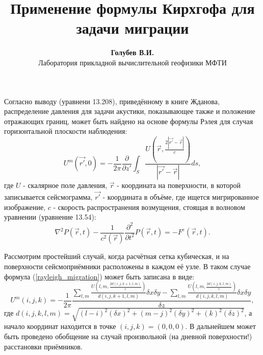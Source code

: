 \documentclass{article}
\begin{document}
\title{Применение формулы Кирхгофа для задачи миграции}
\author{\textbf{Голубев В.И.} \\ Лаборатория прикладной вычислительной геофизики МФТИ}
\maketitle
Согласно выводу (уравнени 13.208), приведённому в книге Жданова, распределение давления для
задачи акустики, показывающее также и положение отражающих границ,
может быть найдено на основе формулы Рэлея для случая горизонтальной плоскости
наблюдения:
\begin{equation}
\label{rayleigh_migration}
U^m(\vec{r'},0) = -\frac{1}{2\pi}\frac{\partial}{\partial z'}
	\int_S \frac{U(\vec{r},\frac{2|\vec{r'}-\vec{r}|}{c})}{|\vec{r'}-\vec{r}|}ds,
\end{equation}
где $U$ - скалярное поле давления, $\vec{r}$ - координата на поверхности, в которой записывается
сейсмограмма, $\vec{r'}$ - координата в объёме, где ищется мигрированное изображение, $c$ - скорость распространения возмущения, стоящая в волновом уравнении (уравнение 13.54):
\begin{equation}
\label{wave_equation}
\nabla^2P(\vec{r},t) - \frac{1}{c^2(\vec{r})}\frac{\partial^2}{\partial t^2}
	P(\vec{r},t) = - F^e(\vec{r},t).
\end{equation}

Рассмотрим простейший случай, когда расчётная сетка кубическая, и на поверхности сейсмоприёмники расположены в каждом её узле.
В таком случае формула (\ref{rayleigh_migration}) может быть записана в виде:
\begin{equation}
\label{rayleigh_migration_discrete}
U^m(i,j,k) = -\frac{1}{2\pi}\frac{\sum\limits_{l,m} \frac{U(l,m,\frac{2d(i,j,k+1,l,m)}{c})}{d(i,j,k+1,l,m)}\delta x \delta y - \sum\limits_{l,m} \frac{U(l,m,\frac{2d(i,j,k,l,m)}{c})}{d(i,j,k,l,m)}\delta x \delta y}{\delta z},
\end{equation}
где $d(i,j,k,l,m)=\sqrt{(l-i)^2(\delta x)^2 + (m-j)^2(\delta y)^2  + (k)^2(\delta z)^2}$, а начало координат находится в точке $(i,j,k)=(0,0,0)$.
В дальнейшем может быть проведено обобщение на случай произвольной (на дневной поверхности!) расстановки приёмников.
\end{document}
